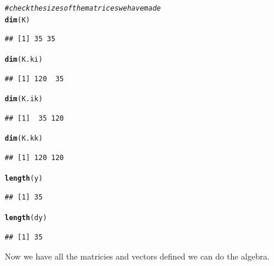\documentclass[a4paper, 11pt, amsmath, graphicx]{article}\usepackage[]{graphicx}\usepackage[]{color}
\makeatletter
\newcommand{\hlcom}[1]{\textcolor[rgb]{0.678,0.584,0.686}{\textit{#1}}}%
\newcommand{\hlstd}[1]{\textcolor[rgb]{0.345,0.345,0.345}{#1}}%
\newcommand{\hlkwd}[1]{\textcolor[rgb]{0.737,0.353,0.396}{\textbf{#1}}}%
\newenvironment{kframe}{%
 \def\at@end@of@kframe{}%
 \ifinner\ifhmode%
  \def\at@end@of@kframe{\end{minipage}}%
  \begin{minipage}{\columnwidth}%
 \fi\fi%
 \def\FrameCommand##1{\hskip\@totalleftmargin \hskip-\fboxsep
 \colorbox{shadecolor}{##1}\hskip-\fboxsep
     \hskip-\linewidth \hskip-\@totalleftmargin \hskip\columnwidth}%
 \MakeFramed {\advance\hsize-\width
   \@totalleftmargin\z@ \linewidth\hsize
   \@setminipage}}%
 {\par\unskip\endMakeFramed%
 \at@end@of@kframe}
\newenvironment{knitrout}{}{} %
\makeatother
\begin{document}
\begin{knitrout}
\color{fgcolor}\begin{kframe}
\begin{alltt}
\hlcom{# check the sizes of the matrices we have made}
  \hlkwd{dim}\hlstd{(K)}
\end{alltt}
\begin{verbatim}
## [1] 35 35
\end{verbatim}
\begin{alltt}
  \hlkwd{dim}\hlstd{(K.ki)}
\end{alltt}
\begin{verbatim}
## [1] 120  35
\end{verbatim}
\begin{alltt}
  \hlkwd{dim}\hlstd{(K.ik)}
\end{alltt}
\begin{verbatim}
## [1]  35 120
\end{verbatim}
\begin{alltt}
  \hlkwd{dim}\hlstd{(K.kk)}
\end{alltt}
\begin{verbatim}
## [1] 120 120
\end{verbatim}
\begin{alltt}
  \hlkwd{length}\hlstd{(y)}
\end{alltt}
\begin{verbatim}
## [1] 35
\end{verbatim}
\begin{alltt}
  \hlkwd{length}\hlstd{(dy)}
\end{alltt}
\begin{verbatim}
## [1] 35
\end{verbatim}
\end{kframe}
\end{knitrout}

Now we have all the matricies and vectors defined we can do the algebra. 
\end{document}
